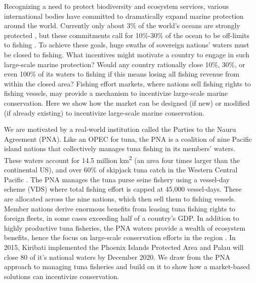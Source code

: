 \documentclass[12pt]{article}
\begin{document}
Recognizing a need to protect biodiversity and ecosystem services, various international bodies have committed to dramatically expand marine protection around the world\cite{oleary_2016}. Currently only about 3\% of the world's oceans are strongly protected \cite{sala_2018}, but these commitments call for 10\%-30\% of the ocean to be off-limits to fishing \cite{oleary_2016,dinerstein_2019}. To achieve these goals, huge swaths of sovereign nations' waters must be closed to fishing. What incentives might motivate a country to engage in such large-scale marine protection? Would any country rationally close 10\%, 30\%, or even 100\% of its waters to fishing if this means losing all fishing revenue from within the closed area? Fishing effort markets, where nations sell fishing rights to fishing vessels, may provide a mechanism to incentivize large-scale marine conservation. Here we show how the market can be designed (if new) or modified (if already existing) to incentivize large-scale marine conservation.

We are motivated by a real-world institution called the Parties to the Nauru Agreement (PNA). Like an OPEC for tuna, the PNA is a coalition of nine Pacific island nations that collectively manages tuna fishing in its members' waters\cite{havice_2013,aqorau_2018}. These waters account for 14.5 million km\textsuperscript{2} (an area four times larger than the continental US), and over 60\% of skipjack tuna catch in the Western Central Pacific \cite{havice_2013}. The PNA manages the tuna purse seine fishery using a vessel-day scheme (VDS) where total fishing effort is capped at 45,000 vessel-days. These are allocated across the nine nations, which then sell them to fishing vessels. Member nations derive enormous benefits from leasing tuna fishing rights to foreign fleets, in some cases exceeding half of a country's GDP. In addition to highly productive tuna fisheries, the PNA waters provide a wealth of ecosystem benefits, hence the focus on large-scale conservation efforts in the region \cite{mcleod_2019}. In 2015, Kiribati implemented the Phoenix Islands Protected Area and Palau will close 80 of it's national waters by December 2020. We draw from the PNA approach to managing tuna fisheries and build on it to show how a market-based solutions can incentivize conservation.
\end{document}
